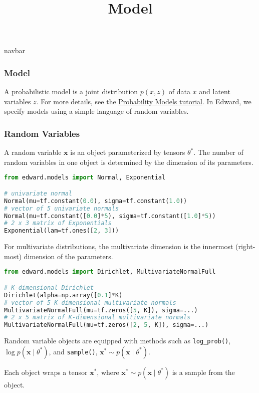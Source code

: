 \title{Model}

{{navbar}}

\subsubsection{Model}

A probabilistic model is a joint distribution $p(x, z)$ of data $x$
and latent variables $z$.
For more details, see the \href{/tutorials/model}{Probability Models tutorial}.
In Edward, we specify models using a simple language of random variables.

\subsubsection{Random Variables}

A random variable $\mathbf{x}$ is an object parameterized by tensors $\theta^*$.
The number of random variables in one object is determined by
the dimension of its parameters.

\begin{lstlisting}[language=Python]
from edward.models import Normal, Exponential

# univariate normal
Normal(mu=tf.constant(0.0), sigma=tf.constant(1.0))
# vector of 5 univariate normals
Normal(mu=tf.constant([0.0]*5), sigma=tf.constant([1.0]*5))
# 2 x 3 matrix of Exponentials
Exponential(lam=tf.ones([2, 3]))
\end{lstlisting}

For multivariate distributions, the multivariate dimension is the
innermost (right-most) dimension of the parameters.

\begin{lstlisting}[language=Python]
from edward.models import Dirichlet, MultivariateNormalFull

# K-dimensional Dirichlet
Dirichlet(alpha=np.array([0.1]*K)
# vector of 5 K-dimensional multivariate normals
MultivariateNormalFull(mu=tf.zeros([5, K]), sigma=...)
# 2 x 5 matrix of K-dimensional multivariate normals
MultivariateNormalFull(mu=tf.zeros([2, 5, K]), sigma=...)
\end{lstlisting}

Random variable objects are equipped with methods such as
\texttt{log_prob()}, $\log p(\mathbf{x}\mid\theta^*)$,
and \texttt{sample()}, $\mathbf{x}^*\sim p(\mathbf{x}\mid\theta^*)$.

Each object wraps a tensor $\mathbf{x}^*$, where
$\mathbf{x}^*\sim p(\mathbf{x}\mid\theta^*)$ is a sample from the
object.

